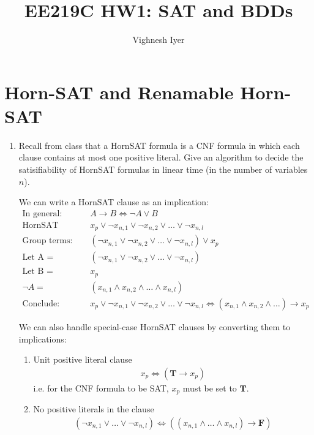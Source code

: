 

\title{EE219C HW1: SAT and BDDs}
\author{Vighnesh Iyer}
\date{}
\maketitle

\section{Horn-SAT and Renamable Horn-SAT}
\begin{enumerate}[label=(\alph*)]
    \item {\color{blue}Recall from class that a HornSAT formula is a CNF formula in which each clause contains at most one positive literal. Give an algorithm to decide the satisifiability of HornSAT formulas in linear time (in the number of variables $n$).}

    We can write a HornSAT clause as an implication:
    \begin{align*}
        \text{In general: } &A \rightarrow B \iff \neg A \lor B \\
        \text{HornSAT Clause: } &x_p \lor \neg x_{n,1} \lor \neg x_{n,2} \lor \dots \lor \neg x_{n,l} \\
        \text{Group terms: } &(\neg x_{n,1} \lor \neg x_{n,2} \lor \dots \lor \neg x_{n,l}) \lor x_p \\
        \text{Let A = } &(\neg x_{n,1} \lor \neg x_{n,2} \lor \dots \lor \neg x_{n,l}) \\
        \text{Let B = } &x_p \\
        \neg A =& (x_{n,1} \land x_{n,2} \land \dots \land x_{n,l}) \\
        \text{Conclude: } &x_p \lor \neg x_{n,1} \lor \neg x_{n,2} \lor \dots \lor \neg x_{n,l} \iff (x_{n,1} \land x_{n,2} \land \dots) \rightarrow x_p
    \end{align*}

    We can also handle special-case HornSAT clauses by converting them to implications:
    \begin{enumerate}
        \item Unit positive literal clause
            \begin{align*}
                x_p \iff (\mathbf{T} \rightarrow x_p)
            \end{align*}
            i.e. for the CNF formula to be SAT, $x_p$ must be set to $\mathbf{T}$.
        \item No positive literals in the clause
            \begin{align*}
                (\neg x_{n,1} \lor \dots \lor \neg x_{n,l}) \iff ((x_{n,1} \land \dots \land x_{n,l}) \rightarrow \mathbf{F})
            \end{align*}
    \end{enumerate}


\end{enumerate}

